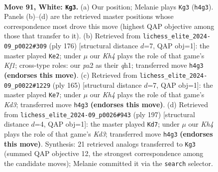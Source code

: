 \documentclass[11pt]{article}
\begin{document}
\clearpage

\begin{figure}[p]\centering
\begin{subfigure}{0.46\textwidth}\centering
\resizebox{\linewidth}{!}{%
\newchessgame
\chessboard[
  setfen={8/8/8/4k3/2p4K/3p4/p7/8 w - - 0 91},
  showmover=false,
  pgfstyle=straightmove, color=movearrow, markmove={h4-g3}
]}
\caption{}
\end{subfigure}\hfill
\begin{subfigure}{0.46\textwidth}\centering
\resizebox{\linewidth}{!}{%
\newchessgame
\chessboard[
  setfen={8/2b2k2/8/5p2/6p1/8/8/5K1q w - - 0 89},
  showmover=false,
  pgfstyle=straightmove, color=movearrow, markmove={f1-e2}
]}
\caption{}
\end{subfigure}
\\[4pt]
\begin{subfigure}{0.46\textwidth}\centering
\resizebox{\linewidth}{!}{%
\newchessgame
\chessboard[
  setfen={8/8/3k2K1/p7/P1B4P/6P1/8/8 b - - 0 83},
  showmover=false,
  pgfstyle=straightmove, color=movearrow, markmove={d6-e7}
]}
\caption{}
\end{subfigure}\hfill
\begin{subfigure}{0.46\textwidth}\centering
\resizebox{\linewidth}{!}{%
\newchessgame
\chessboard[
  setfen={8/8/pP1k4/P7/8/2K5/8/8 b - - 0 99},
  showmover=false,
  pgfstyle=straightmove, color=movearrow, markmove={d6-d7}
]}
\caption{}
\end{subfigure}
\caption{\textbf{Move 91, White: \texttt{Kg3}.} (a) Our position; Melanie plays \texttt{Kg3} (\texttt{h4g3}). Panels (b)--(d) are the retrieved master positions whose correspondence most drove this move (highest QAP objective among those that transfer to it). (b) Retrieved from \texttt{lichess\_elite\_2024-09\_p0022\#309} (ply 176) [structural distance $d$=7, QAP obj=1]: the master played \texttt{Ke2}; under $\mu$ our \emph{Kh4} plays the role of that game's \emph{Kf1}; cross-type roles: our \emph{p}a2 as their \emph{q}h1; transferred move \texttt{h4g3} \textbf{(endorses this move)}. (c) Retrieved from \texttt{lichess\_elite\_2024-09\_p0022\#1229} (ply 165) [structural distance $d$=7, QAP obj=1]: the master played \texttt{Ke7}; under $\mu$ our \emph{Kh4} plays the role of that game's \emph{Kd3}; transferred move \texttt{h4g3} \textbf{(endorses this move)}. (d) Retrieved from \texttt{lichess\_elite\_2024-09\_p0026\#943} (ply 197) [structural distance $d$=4, QAP obj=1]: the master played \texttt{Kd7}; under $\mu$ our \emph{Kh4} plays the role of that game's \emph{Kd3}; transferred move \texttt{h4g3} \textbf{(endorses this move)}. Synthesis: 21 retrieved analogs transferred to \texttt{Kg3} (summed QAP objective 12, the strongest correspondence among the candidate moves); Melanie committed it via the \texttt{search} selector.}
\label{fig:thought-m180}
\end{figure}
\end{document}
